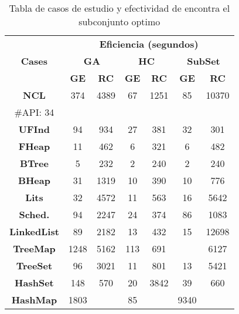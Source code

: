\begin{table}[t]
\centering
\label{tab:t1}
\scriptsize
\begin{tabular}{|c c|cc|cc|cc|}
\midrule
\multicolumn{2}{|c|}{\multirow{3}{*}{\textbf{Cases}}} & \multicolumn{6}{c|}{\textbf{Eficiencia (segundos)}} \\
\cline{3-8}
\multicolumn{2}{|c|}{} & \multicolumn{2}{c}{\textbf{GA}} & \multicolumn{2}{c}{\textbf{HC}} & \multicolumn{2}{c|}{\textbf{SubSet}} \\
\multicolumn{2}{|c|}{} & \textbf{\tiny{GE}} & \textbf{\tiny{RC}} & \textbf{\tiny{GE}} & \textbf{\tiny{RC}} & \textbf{\tiny{GE}} & \textbf{\tiny{RC}} \\
\midrule
\multicolumn{2}{|c|}{\textbf{NCL}} & 374  & 4389   & 67 &  1251 &85 & 10370 \\
 \multicolumn{2}{|c|}{\scriptsize \#API: 34}&   &   &   &   &   &      \\
\midrule
\multicolumn{2}{|c|}{\textbf{UFInd}}& 94  & 934  &  27 &381   & 32  &  301    \\
\midrule

\multicolumn{2}{|c|}{\textbf{FHeap}} & 11  & 462  & 6  &321   &  6 &  482   \\
\midrule

\multicolumn{2}{|c|}{\textbf{BTree}} &  5 &  232 & 2  & 240   &  2 & 240   \\
\midrule

\multicolumn{2}{|c|}{\textbf{BHeap}} & 31 &  1319 & 10 & 390  & 10 &  776   \\
\midrule

\multicolumn{2}{|c|}{\textbf{Lits}} & 32  & 4572  & 11  &  563 & 16  & 5642   \\
\midrule

\multicolumn{2}{|c|}{\textbf{Sched.}} &   94& 2247  & 24  & 374  & 86  &1083    \\

\midrule
\multicolumn{2}{|c|}{\textbf{LinkedList}} & 89 &  2182 &  13 &  432 & 15 &  12698  \\
\midrule

\multicolumn{2}{|c|}{\textbf{TreeMap}} & 1248  &  5162 &  113 & 691  &   &   6127  \\
\midrule

\multicolumn{2}{|c|}{\textbf{TreeSet}} &  96 & 3021  &  11 & 801  &  13 &  5421  \\
\midrule

\multicolumn{2}{|c|}{\textbf{HashSet}} &  148 &  570 & 20  &  3842 &  39 &   660 \\
\midrule

\multicolumn{2}{|c|}{\textbf{HashMap}} &  1803 &   &  85 &   &   9340&    \\
\hline
\end{tabular}

\caption{Tabla de casos de estudio y efectividad de encontra el subconjunto optimo}
\label{tab:eficiencia}
\end{table}

